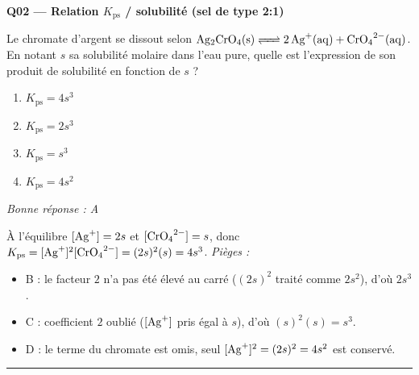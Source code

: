 \documentclass[11pt,a4paper]{article}
\begin{document}
\noindent\textbf{Q02 --- Relation $K_{\mathrm{ps}}$ / solubilité (sel de type 2:1)}\par
Le chromate d'argent  se dissout selon
$\ce{Ag2CrO4(s) <=> 2 Ag^{+}(aq) + CrO4^{2-}(aq)}$. En notant $s$ sa solubilité molaire dans l'eau pure,
quelle est l'expression de son produit de solubilité en fonction de $s$ ?
\begin{enumerate}[label=\Alph*)]
\item $K_{\mathrm{ps}} = 4s^{3}$
\item $K_{\mathrm{ps}} = 2s^{3}$
\item $K_{\mathrm{ps}} = s^{3}$
\item $K_{\mathrm{ps}} = 4s^{2}$
\end{enumerate}
\textit{Bonne réponse : A}\par
À l'équilibre $[\ce{Ag+}] = 2s$ et $[\ce{CrO4^{2-}}] = s$, donc
$K_{\mathrm{ps}} = [\ce{Ag+}]^{2}[\ce{CrO4^{2-}}] = (2s)^{2}(s) = 4s^{3}$.
\textit{Pièges :}
\begin{itemize}
\item B : le facteur $2$ n'a pas été élevé au carré ($(2s)^{2}$ traité comme $2s^{2}$), d'où $2s^{3}$.
\item C : coefficient $2$ oublié ($[\ce{Ag+}]$ pris égal à $s$), d'où $(s)^{2}(s) = s^{3}$.
\item D : le terme du chromate est omis, seul $[\ce{Ag+}]^{2} = (2s)^{2} = 4s^{2}$ est conservé.
\end{itemize}
\vspace{6pt}\hrule\vspace{8pt}
\end{document}
